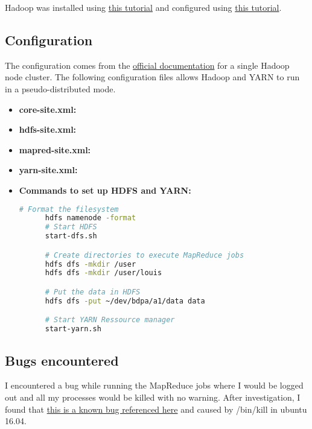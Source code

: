\documentclass[a4paper,12pt]{article}
\begin{document}
Hadoop was installed using \href{https://www.digitalocean.com/community/tutorials/how-to-install-hadoop-in-stand-alone-mode-on-ubuntu-16-04}{this tutorial} and configured using \href{https://hadoop.apache.org/docs/stable/hadoop-project-dist/hadoop-common/SingleCluster.html}{this tutorial}.


\subsection{Configuration}
The configuration comes from the \href{https://hadoop.apache.org/docs/stable/hadoop-project-dist/hadoop-common/SingleCluster.html}{official documentation} for a single Hadoop node cluster.
The following configuration files allows Hadoop and YARN to run in a pseudo-distributed mode.
\begin{itemize}
    \item \textbf{core-site.xml:}
    
    \item \textbf{hdfs-site.xml:}
    
    \item \textbf{mapred-site.xml:}
    
    \item \textbf{yarn-site.xml:}
    
    \item \textbf{Commands to set up HDFS and YARN:}
    \begin{lstlisting}[language=bash]
      # Format the filesystem
      hdfs namenode -format
      # Start HDFS
      start-dfs.sh

      # Create directories to execute MapReduce jobs
      hdfs dfs -mkdir /user
      hdfs dfs -mkdir /user/louis

      # Put the data in HDFS
      hdfs dfs -put ~/dev/bdpa/a1/data data

      # Start YARN Ressource manager
      start-yarn.sh
    \end{lstlisting}
\end{itemize}


\subsection{Bugs encountered}
I encountered a bug while running the MapReduce jobs where I would be logged out and all my processes would be killed with no warning.
After investigation, I found that \href{https://bugs.launchpad.net/ubuntu/+source/procps/+bug/1610499}{this is a known bug referenced here} and caused by /bin/kill in ubuntu 16.04.
\end{document}
